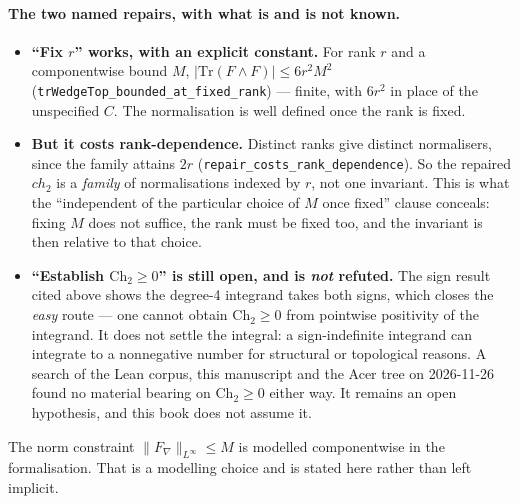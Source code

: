 \begin{remark}
\paragraph{The two named repairs, with what is and is not known.}
\begin{itemize}
\item \textbf{``Fix $r$'' works, with an explicit constant.} For rank $r$ and a
  componentwise bound $M$, $|\mathrm{Tr}(F\wedge F)| \le 6 r^2 M^2$
  (\texttt{trWedgeTop\_bounded\_at\_fixed\_rank}) --- finite, with $6r^2$ in
  place of the unspecified $C$. The normalisation is well defined once the rank
  is fixed.
\item \textbf{But it costs rank-dependence.} Distinct ranks give distinct
  normalisers, since the family attains $2r$
  (\texttt{repair\_costs\_rank\_dependence}). So the repaired $ch_2$ is a
  \emph{family} of normalisations indexed by $r$, not one invariant. This is
  what the ``independent of the particular choice of $M$ once fixed'' clause
  conceals: fixing $M$ does not suffice, the rank must be fixed too, and the
  invariant is then relative to that choice.
\item \textbf{``Establish $\mathrm{Ch}_2 \ge 0$'' is still open, and is
  \emph{not} refuted.} The sign result cited above shows the degree-4 integrand
  takes both signs, which closes the \emph{easy} route --- one cannot obtain
  $\mathrm{Ch}_2 \ge 0$ from pointwise positivity of the integrand. It does not
  settle the integral: a sign-indefinite integrand can integrate to a
  nonnegative number for structural or topological reasons. A search of the Lean
  corpus, this manuscript and the Acer tree on 2026-11-26 found no material
  bearing on $\mathrm{Ch}_2 \ge 0$ either way. It remains an open hypothesis,
  and this book does not assume it.
\end{itemize}

\noindent The norm constraint $\|F_\nabla\|_{L^\infty} \le M$ is modelled
componentwise in the formalisation. That is a modelling choice and is stated
here rather than left implicit.


\end{remark}
